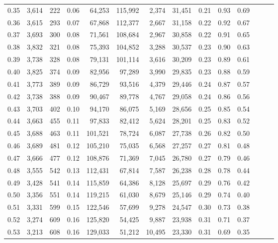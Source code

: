 \begin{tabular}{rrrrrrrrrrrrrr}
0.35 &  3,614 &  222 &  0.06 &   64,253 &  115,992 &   2,374 &  31,451 &  0.21 &  0.93 &      0.69 \\
0.36 &  3,615 &  293 &  0.07 &   67,868 &  112,377 &   2,667 &  31,158 &  0.22 &  0.92 &      0.67 \\
0.37 &  3,693 &  300 &  0.08 &   71,561 &  108,684 &   2,967 &  30,858 &  0.22 &  0.91 &      0.65 \\
0.38 &  3,832 &  321 &  0.08 &   75,393 &  104,852 &   3,288 &  30,537 &  0.23 &  0.90 &      0.63 \\
0.39 &  3,738 &  328 &  0.08 &   79,131 &  101,114 &   3,616 &  30,209 &  0.23 &  0.89 &      0.61 \\
0.40 &  3,825 &  374 &  0.09 &   82,956 &   97,289 &   3,990 &  29,835 &  0.23 &  0.88 &      0.59 \\
0.41 &  3,773 &  389 &  0.09 &   86,729 &   93,516 &   4,379 &  29,446 &  0.24 &  0.87 &      0.57 \\
0.42 &  3,738 &  388 &  0.09 &   90,467 &   89,778 &   4,767 &  29,058 &  0.24 &  0.86 &      0.56 \\
0.43 &  3,703 &  402 &  0.10 &   94,170 &   86,075 &   5,169 &  28,656 &  0.25 &  0.85 &      0.54 \\
0.44 &  3,663 &  455 &  0.11 &   97,833 &   82,412 &   5,624 &  28,201 &  0.25 &  0.83 &      0.52 \\
0.45 &  3,688 &  463 &  0.11 &  101,521 &   78,724 &   6,087 &  27,738 &  0.26 &  0.82 &      0.50 \\
0.46 &  3,689 &  481 &  0.12 &  105,210 &   75,035 &   6,568 &  27,257 &  0.27 &  0.81 &      0.48 \\
0.47 &  3,666 &  477 &  0.12 &  108,876 &   71,369 &   7,045 &  26,780 &  0.27 &  0.79 &      0.46 \\
0.48 &  3,555 &  542 &  0.13 &  112,431 &   67,814 &   7,587 &  26,238 &  0.28 &  0.78 &      0.44 \\
0.49 &  3,428 &  541 &  0.14 &  115,859 &   64,386 &   8,128 &  25,697 &  0.29 &  0.76 &      0.42 \\
0.50 &  3,356 &  551 &  0.14 &  119,215 &   61,030 &   8,679 &  25,146 &  0.29 &  0.74 &      0.40 \\
0.51 &  3,331 &  599 &  0.15 &  122,546 &   57,699 &   9,278 &  24,547 &  0.30 &  0.73 &      0.38 \\
0.52 &  3,274 &  609 &  0.16 &  125,820 &   54,425 &   9,887 &  23,938 &  0.31 &  0.71 &      0.37 \\
0.53 &  3,213 &  608 &  0.16 &  129,033 &   51,212 &  10,495 &  23,330 &  0.31 &  0.69 &      0.35 \\

\end{tabular}
